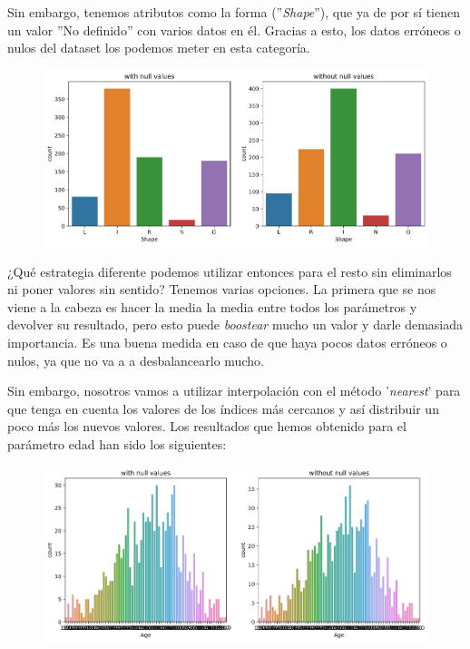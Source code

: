 \documentclass[11pt,a4paper]{article}
\begin{document}
Sin embargo, tenemos atributos como la forma (''\textit{Shape}''), que ya de por sí tienen un valor ''No definido'' con varios
datos en él. Gracias a esto, los datos erróneos o nulos del dataset los podemos meter en esta categoría. 
\begin{figure}[H]
    \centering
    \includegraphics[scale=0.35]{img/shape-refill.png}
\end{figure}

\newpage

¿Qué estrategia diferente podemos utilizar entonces para el resto sin eliminarlos ni poner valores sin sentido? Tenemos varias
opciones. La primera que se nos viene a la cabeza es hacer la media la media entre todos los parámetros y devolver su resultado,
pero esto puede \textit{boostear} mucho un valor y darle demasiada importancia. Es una buena medida en caso de que haya pocos
datos erróneos o nulos, ya que no va a a desbalancearlo mucho.

Sin embargo, nosotros vamos a utilizar interpolación con el método '\textit{nearest}' para que tenga en cuenta los valores de los
índices más cercanos y así distribuir un poco más los nuevos valores. Los resultados que hemos obtenido para el parámetro edad
han sido los siguientes:
\begin{figure}[H]
    \centering
    \includegraphics[scale=0.35]{img/age-refill.png}
\end{figure}
\end{document}
